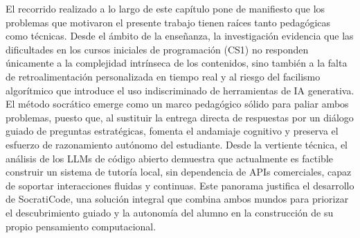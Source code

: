 El recorrido realizado a lo largo de este capítulo pone de manifiesto que los problemas que motivaron el presente trabajo tienen raíces tanto pedagógicas como técnicas. Desde el ámbito de la enseñanza, la investigación evidencia que las dificultades en los cursos iniciales de programación (CS1) no responden únicamente a la complejidad intrínseca de los contenidos, sino también a la falta de retroalimentación personalizada en tiempo real y al riesgo del facilismo algorítmico que introduce el uso indiscriminado de herramientas de IA generativa. El método socrático emerge como un marco pedagógico sólido para paliar ambos problemas, puesto que, al sustituir la entrega directa de respuestas por un diálogo guiado de preguntas estratégicas, fomenta el andamiaje cognitivo y preserva el esfuerzo de razonamiento autónomo del estudiante. Desde la vertiente técnica, el análisis de los LLMs de código abierto demuestra que actualmente es factible construir un sistema de tutoría local, sin dependencia de APIs comerciales, capaz de soportar interacciones fluidas y continuas. Este panorama justifica el desarrollo de SocratiCode, una solución integral que combina ambos mundos para priorizar el descubrimiento guiado y la autonomía del alumno en la construcción de su propio pensamiento computacional.